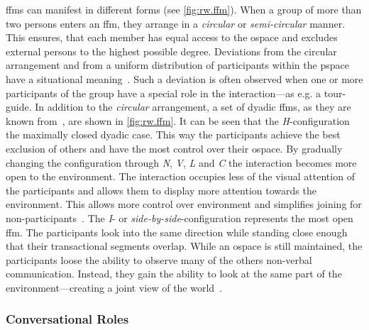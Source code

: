 \Glspl{ffm} can manifest in different forms (see \cref{fig:rw.ffm}).
When a group of more than two persons enters an \gls{ffm}, they arrange in a \emph{circular} or \emph{semi-circular} manner.
This ensures, that each member has equal access to the \gls{ospace} and excludes external persons to the highest possible degree.
Deviations from the circular arrangement and from a uniform distribution of participants within the \gls{pspace} have a situational meaning~\cite[p. 216]{kendon1990}.
Such a deviation is often observed when one or more participants of the group have a special role in the interaction---as e.g. a tour-guide.
In addition to the \emph{circular} arrangement, a set of dyadic \glspl{ffm}, as they are known from~, are shown in \cref{fig:rw.ffm}.
It can be seen that the \emph{H}-configuration the maximally closed dyadic case.
This way the participants achieve the best exclusion of others and have the most control over their \gls{ospace}.
By gradually changing the configuration through \emph{N}, \emph{V}, \emph{L} and \emph{C} the interaction becomes more open to the environment.
The interaction occupies less of the visual attention of the participants and allows them to display more attention towards the environment.
This allows more control over environment and simplifies joining for \glspl{non-participant}~\cite[p. 226]{kendon1990}.
The \emph{I}- or \emph{side-by-side}-configuration represents the most open \gls{ffm}.
The participants look into the same direction while standing close enough that their \glspl{transactional segment} overlap.
While an \gls{ospace} is still maintained, the participants loose the ability to observe many of the others non-verbal communication.
Instead, they gain the ability to look at the same part of the environment---creating a joint view of the world~\cite[p. 251]{kendon1990}.

\subsubsection{Conversational Roles}\label{sec.rw.hi.cr}

